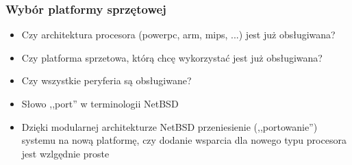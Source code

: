 \documentclass[dvipsnames,table]{beamer}
\begin{document}
\begin{frame}
\frametitle{Wybór platformy sprzętowej}
\begin{itemize}
	\item Czy architektura procesora (powerpc, arm, mips, ...) jest już obsługiwana? 
	\item Czy platforma sprzetowa, którą chcę wykorzystać jest już obsługiwana?
	\item Czy wszystkie peryferia są obsługiwane?
	\item Słowo ,,port'' w terminologii NetBSD
	\item Dzięki modularnej architekturze NetBSD przeniesienie (,,portowanie'') systemu na nową platformę, czy dodanie wsparcia dla nowego typu procesora jest wzlgędnie proste
\end{itemize}
\end{frame}
\end{document}

